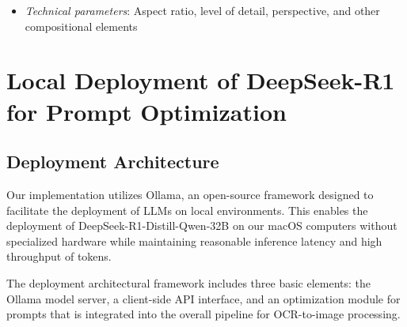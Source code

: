 \begin{itemize}
    \item \textit{Technical parameters}: Aspect ratio, level of detail, perspective, and other compositional elements
\end{itemize}




\section{Local Deployment of DeepSeek-R1 for Prompt Optimization}
\label{sec:local-deployment}

\subsection{Deployment Architecture}
\label{subsec:deployment-architecture}

Our implementation utilizes Ollama, an open-source framework designed to facilitate the deployment of LLMs on local environments. This enables the deployment of DeepSeek-R1-Distill-Qwen-32B on our macOS computers without specialized hardware while maintaining reasonable inference latency and high throughput of tokens.

The deployment architectural framework includes three basic elements: the Ollama model server, a client-side API interface, and an optimization module for prompts that is integrated into the overall pipeline for OCR-to-image processing. 

